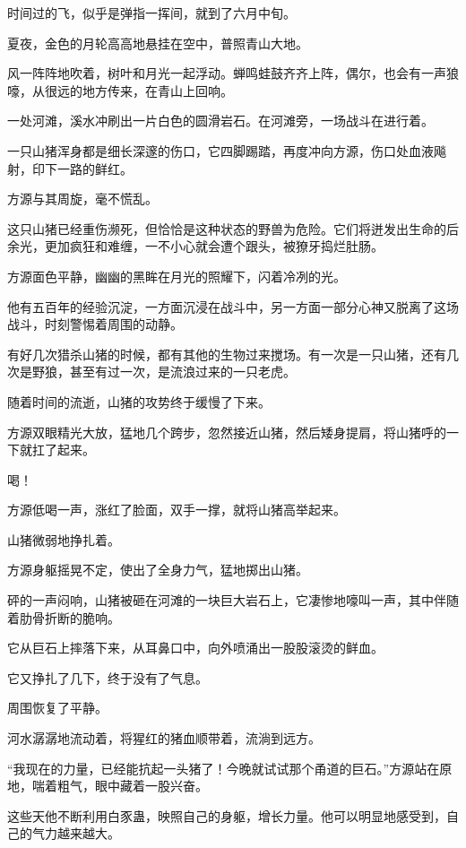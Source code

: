 
\begin{this_body}

时间过的飞，似乎是弹指一挥间，就到了六月中旬。

夏夜，金色的月轮高高地悬挂在空中，普照青山大地。

风一阵阵地吹着，树叶和月光一起浮动。蝉鸣蛙鼓齐齐上阵，偶尔，也会有一声狼嚎，从很远的地方传来，在青山上回响。

一处河滩，溪水冲刷出一片白色的圆滑岩石。在河滩旁，一场战斗在进行着。

一只山猪浑身都是细长深邃的伤口，它四脚踢踏，再度冲向方源，伤口处血液飚射，印下一路的鲜红。

方源与其周旋，毫不慌乱。

这只山猪已经重伤濒死，但恰恰是这种状态的野兽为危险。它们将迸发出生命的后余光，更加疯狂和难缠，一不小心就会遭个跟头，被獠牙捣烂肚肠。

方源面色平静，幽幽的黑眸在月光的照耀下，闪着冷冽的光。

他有五百年的经验沉淀，一方面沉浸在战斗中，另一方面一部分心神又脱离了这场战斗，时刻警惕着周围的动静。

有好几次猎杀山猪的时候，都有其他的生物过来搅场。有一次是一只山猪，还有几次是野狼，甚至有过一次，是流浪过来的一只老虎。

随着时间的流逝，山猪的攻势终于缓慢了下来。

方源双眼精光大放，猛地几个跨步，忽然接近山猪，然后矮身提肩，将山猪呼的一下就扛了起来。

喝！

方源低喝一声，涨红了脸面，双手一撑，就将山猪高举起来。

山猪微弱地挣扎着。

方源身躯摇晃不定，使出了全身力气，猛地掷出山猪。

砰的一声闷响，山猪被砸在河滩的一块巨大岩石上，它凄惨地嚎叫一声，其中伴随着肋骨折断的脆响。

它从巨石上摔落下来，从耳鼻口中，向外喷涌出一股股滚烫的鲜血。

它又挣扎了几下，终于没有了气息。

周围恢复了平静。

河水潺潺地流动着，将猩红的猪血顺带着，流淌到远方。

“我现在的力量，已经能抗起一头猪了！今晚就试试那个甬道的巨石。”方源站在原地，喘着粗气，眼中藏着一股兴奋。

这些天他不断利用白豕蛊，映照自己的身躯，增长力量。他可以明显地感受到，自己的气力越来越大。


\end{this_body}
